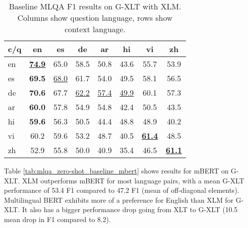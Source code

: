 \documentclass[11pt]{article}
\begin{document}
\begin{table}[ht]
\centering
\begin{adjustbox}{max width=\columnwidth}
\begin{tabular}{l|ccccccc}
\toprule
c/q & en   & es   & de   & ar   & hi   & vi   & zh   \\ \midrule
en  & \underline{\textbf{74.9}} & 65.0 & 58.5 & 50.8 & 43.6 & 55.7 & 53.9 \\
es  & \textbf{69.5} & \underline{68.0} & 61.7 & 54.0 & 49.5 & 58.1 & 56.5 \\
de  & \textbf{70.6} & 67.7 & \underline{62.2} & \underline{57.4} & \underline{49.9} & 60.1 & 57.3 \\
ar  & \textbf{60.0} & 57.8 & 54.9 & 54.8 & 42.4 & 50.5 & 43.5 \\
hi  & \textbf{59.6} & 56.3 & 50.5 & 44.4 & 48.8 & 48.9 & 40.2 \\
vi  & 60.2 & 59.6 & 53.2 & 48.7 & 40.5 & \underline{\textbf{61.4}} & 48.5 \\
zh  & 52.9 & 55.8 & 50.0 & 40.9 & 35.4 & 46.5 & \underline{\textbf{61.1}} \\ \bottomrule
\end{tabular}
\end{adjustbox}
\caption{Baseline MLQA F1 results on G-XLT with XLM. Columns show question language, rows show context language.}
\label{tab:mlqa_zero-shot_baseline_xlm}
\end{table}

Table \ref{tab:mlqa_zero-shot_baseline_mbert} shows results for mBERT on  G-XLT. XLM outperforms mBERT for most language pairs, with a mean G-XLT performance of 53.4 F1 compared to 47.2 F1 (mean of off-diagonal elements). Multilingual BERT exhibits more of a preference for English than XLM for G-XLT. It also has a bigger performance drop going from XLT to G-XLT (10.5 mean drop in F1 compared to 8.2).
\end{document}
